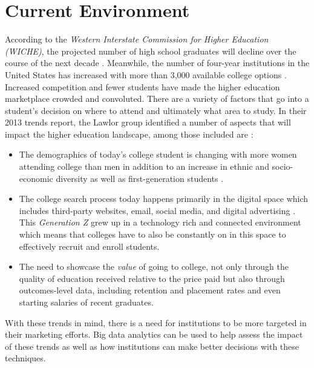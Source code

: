 \documentclass[sigconf]{acmart}
\begin{document}
\section{Current Environment}

According to the \textit{Western Interstate Commission for Higher Education (WICHE)}, the projected number of high school graduates will decline over the course of the next decade \cite{Bransberger2017}. Meanwhile, the number of four-year institutions in the United States has increased with more than 3,000 available college options \cite{EducationStatistics2015}. Increased competition and fewer students have made the higher education marketplace crowded and convoluted. There are a variety of factors that go into a student's decision on where to attend and ultimately what area to study. In their 2013 trends report, the Lawlor group  identified a number of aspects that will impact the higher education landscape, among those included are \cite{Research2014}:

\begin{itemize}
\item The demographics of today's college student is changing with more women attending college than men in addition to an increase in ethnic and socio-economic diversity as well as first-generation students \cite{Bransberger2017}.

\item The college search process today happens primarily in the digital space which includes third-party websites, email, social media, and digital advertising \cite{Geyer2016}. This \textit{Generation Z} grew up in a technology rich and connected environment which means that colleges have to also be constantly on in this space to effectively recruit and enroll students.

\item The need to showcase the \textit{value} of going to college, not only through the quality of education received relative to the price paid but also through outcomes-level data, including retention and placement rates and even starting salaries of recent graduates. 
\end{itemize}

With these trends in mind, there is a need for institutions to be more targeted in their marketing efforts. Big data analytics can be used to help assess the impact of these trends as well as how institutions can make better decisions with these techniques.
\end{document}
